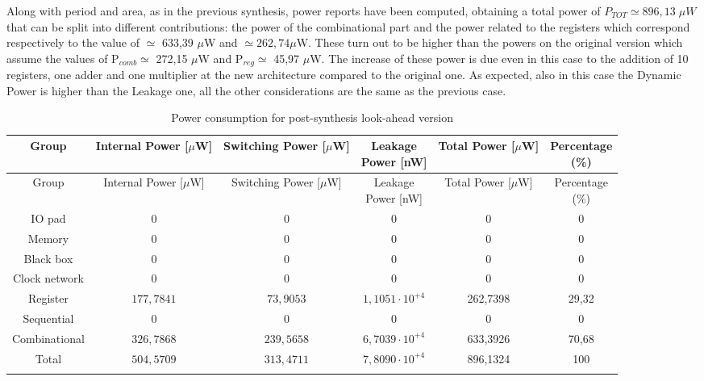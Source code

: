 \documentclass[a4paper, titlepage]{article}
\begin{document}
\noindent
Along with period and area, as in the previous synthesis, power reports have been computed, obtaining a total power of $P_{TOT} \simeq 896,13 \; \mu W$ that can be split into different contributions: the power of the combinational part and the power related to the registers which correspond respectively to the value of $\simeq$ 633,39 $\mu$W and $\simeq262,74 \mu$W. These turn out to be higher than the powers on the original version which assume the values of P$_{comb}\simeq$ 272,15 $\mu$W and P$_{reg}\simeq$ 45,97 $\mu$W. The increase of these power is due even in this case to the addition of 10 registers, one adder and one multiplier at the new architecture compared to the original one. As expected, also in this case the Dynamic Power is higher than the Leakage one, all the other considerations are the same as the previous case.
\newpage
\begin{longtable}{*6c} 
\caption{Power consumption for post-synthesis look-ahead version}
\label{tab:power_postsynth_LA}\\
\toprule
Group & \thead{Internal\\Power [$\mu$W]} & \thead{Switching\\Power [$\mu$W]} & \thead{Leakage\\Power [nW]} & \thead{Total\\Power  [$\mu$W]}& \thead{Percentage\\(\%)}\\
\midrule
\endfirsthead
Group & \thead{Internal\\Power [$\mu$W]} & \thead{Switching\\Power [$\mu$W]} & \thead{Leakage\\Power [nW]} & \thead{Total\\Power  [$\mu$W]}& \thead{Percentage\\(\%)}\\
\midrule
\endhead
\midrule
\endfoot
IO pad & 0 & 0 & 0 & 0 & 0\\
Memory & 0 & 0 & 0 & 0 & 0\\
Black box & 0 & 0 & 0 & 0 & 0\\
Clock network & 0 & 0 & 0 & 0 & 0\\
Register & $177,7841$ & $73,9053 $ & $1,1051 \cdot10^{+4}$ & 262,7398 & 29,32\\
Sequential & 0 & 0 & 0 & 0 & 0\\

Combinational  & $326,7868$ & $239,5658$ & $6,7039 \cdot10^{+4}$ & 633,3926 & 70,68\\
\bottomrule
Total & $504,5709$ & $313,4711$ & $7,8090 \cdot10^{+4}$ & 896,1324 & 100\\
\endlastfoot
\end{longtable}
\end{document}
